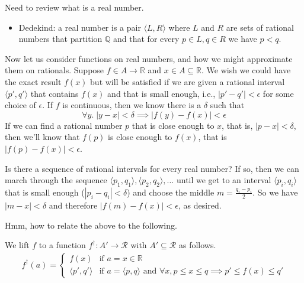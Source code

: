 \documentclass{article}
\newcommand{\Reals}[0]{\mathbb{R}}
\newcommand{\Rats}[0]{\mathbb{Q}}
\begin{document}
Need to review what is a real number.
\begin{itemize}
\item Dedekind: a real number is a pair $\langle L, R \rangle$
  where $L$ and $R$ are sets of rational numbers that partition
  $\Rats$ and that for every $p \in L, q \in R$ we have $p < q$.
\end{itemize}



Now let us consider functions on real numbers, and how we might
approximate them on rationals. Suppose $f \in A \to \Reals$ and $x \in
A \subseteq \Reals$. We wish we could have the exact result $f(x)$ but
will be satisfied if we are given a rational interval $\langle p', q'
\rangle$ that contains $f(x)$ and that is small enough, i.e., $|p' -
q'| < \epsilon$ for some choice of $\epsilon$.  If $f$ is continuous,
then we know there is a $\delta$ such that
\[
  \forall y.\; |y-x| < \delta \implies |f(y) - f(x)| < \epsilon
\]
If we can find a rational number $p$ that is close enough to $x$, that
is, $|p-x| < \delta$, then we'll know that $f(p)$ is close enough to
$f(x)$, that is $|f(p) - f(x)| < \epsilon$. 

Is there a sequence of rational intervals for every real number?  If
so, then we can march through the sequence $\langle p_1,q_1 \rangle,
\langle p_2,q_2 \rangle, \ldots$ until we get to an interval $\langle
p_i,q_i \rangle$ that is small enough ($|p_i - q_i| < \delta$) and
choose the middle $m=\frac{q_i - p_i}{2}$. So we have $|m - x| <
\delta$ and therefore $|f(m) - f(x)| < \epsilon$, as desired.








Hmm, how to relate the above to the following.

We lift $f$ to a function $f^\dagger : A' \to \mathcal{R}$ with $A'
\subseteq \mathcal{R}$ as follows.
\begin{align*}
  f^\dagger(a) = 
  \begin{cases}
    f(x) & \text{if } a=x \in \Reals \\
    \langle p',q' \rangle & \text{if } a = \langle p,q \rangle \text{ and }
         \forall x, p \leq x \leq q \implies p' \leq f(x) \leq q'
  \end{cases}
\end{align*}
\end{document}
